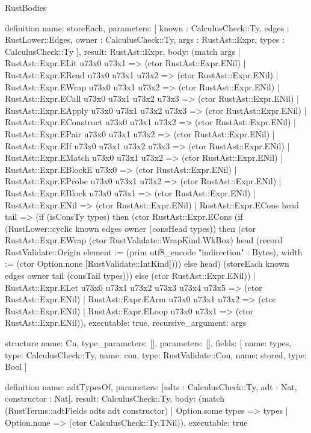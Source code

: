 \begin{lexlean}{RustBodies}
\begin{semanticmodule}
definition{
  name: storeEach,
  parameters: [
    known : CalculusCheck::Ty,
    edges : RustLower::Edges,
    owner : CalculusCheck::Ty,
    args : RustAst::Expr,
    types : CalculusCheck::Ty
  ],
  result: RustAst::Expr,
  body: (match args
    | RustAst::Expr.ELit u73x0 u73x1 => (ctor RustAst::Expr.ENil)
    | RustAst::Expr.ERead u73x0 u73x1 u73x2 => (ctor RustAst::Expr.ENil)
    | RustAst::Expr.EWrap u73x0 u73x1 u73x2 => (ctor RustAst::Expr.ENil)
    | RustAst::Expr.ECall u73x0 u73x1 u73x2 u73x3 => (ctor RustAst::Expr.ENil)
    | RustAst::Expr.EApply u73x0 u73x1 u73x2 u73x3 => (ctor RustAst::Expr.ENil)
    | RustAst::Expr.EConstruct u73x0 u73x1 u73x2 => (ctor RustAst::Expr.ENil)
    | RustAst::Expr.EPair u73x0 u73x1 u73x2 => (ctor RustAst::Expr.ENil)
    | RustAst::Expr.EIf u73x0 u73x1 u73x2 u73x3 => (ctor RustAst::Expr.ENil)
    | RustAst::Expr.EMatch u73x0 u73x1 u73x2 => (ctor RustAst::Expr.ENil)
    | RustAst::Expr.EBlockE u73x0 => (ctor RustAst::Expr.ENil)
    | RustAst::Expr.EProbe u73x0 u73x1 u73x2 => (ctor RustAst::Expr.ENil)
    | RustAst::Expr.EBlock u73x0 u73x1 => (ctor RustAst::Expr.ENil)
    | RustAst::Expr.ENil => (ctor RustAst::Expr.ENil)
    | RustAst::Expr.ECons head tail => (if (isConsTy types) then (ctor RustAst::Expr.ECons (if (RustLower::cyclic known edges owner (consHead types)) then (ctor RustAst::Expr.EWrap (ctor RustValidate::WrapKind.WkBox) head (record RustValidate::Origin {element := (prim utf8_encode "indirection" : Bytes), width := (ctor Option.none [RustValidate::IntKind])})) else head) (storeEach known edges owner tail (consTail types))) else (ctor RustAst::Expr.ENil))
    | RustAst::Expr.ELet u73x0 u73x1 u73x2 u73x3 u73x4 u73x5 => (ctor RustAst::Expr.ENil)
    | RustAst::Expr.EArm u73x0 u73x1 u73x2 => (ctor RustAst::Expr.ENil)
    | RustAst::Expr.ELoop u73x0 u73x1 => (ctor RustAst::Expr.ENil)),
  executable: true,
  recursive_argument: args
}

structure{
  name: Cn,
  type_parameters: [],
  parameters: [],
  fields: [
    {name: types, type: CalculusCheck::Ty},
    {name: con, type: RustValidate::Con},
    {name: stored, type: Bool}
  ]
}

definition{
  name: adtTypesOf,
  parameters: [adts : CalculusCheck::Ty, adt : Nat, constructor : Nat],
  result: CalculusCheck::Ty,
  body: (match (RustTerms::adtFields adts adt constructor)
    | Option.some types => types
    | Option.none => (ctor CalculusCheck::Ty.TNil)),
  executable: true
}


\end{semanticmodule}
\end{lexlean}
